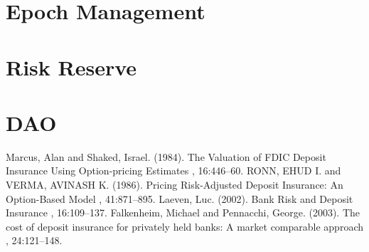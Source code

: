 \documentclass[10pt, a4paper, twocolumn]{article} %
\begin{document}
\section{Epoch Management}\label{sec:epoch-management}


\section{Risk Reserve}\label{sec:risk-reserve}


\section{DAO}\label{sec:dao}

\printbibliography[title={Bibliography}] %
\begin{thebibliography}{99} %
Marcus, Alan and Shaked, Israel.
(1984).
\newblock The Valuation of FDIC Deposit Insurance Using Option-pricing Estimates
, 16:446--60.
RONN, EHUD I. and VERMA, AVINASH K.
(1986).
\newblock Pricing Risk-Adjusted Deposit Insurance: An Option-Based Model
, 41:871--895.
Laeven, Luc.
(2002).
\newblock Bank Risk and Deposit Insurance
, 16:109--137.
Falkenheim, Michael and Pennacchi, George.
(2003).
\newblock The cost of deposit insurance for privately held banks: A market comparable approach
, 24:121--148.
\end{thebibliography}

\end{document}

